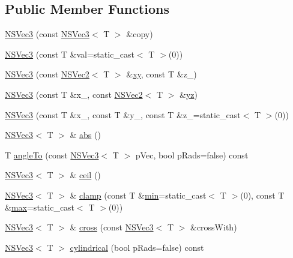 \subsection*{Public Member Functions}
\begin{DoxyCompactItemize}
\item 
\hyperlink{structNSVec3_afa2852c9c17d1de1ab37ed323a54cedb}{N\-S\-Vec3} (const \hyperlink{structNSVec3}{N\-S\-Vec3}$<$ T $>$ \&copy)
\item 
\hyperlink{structNSVec3_ad362b1e55972d16a1752adb532b90678}{N\-S\-Vec3} (const T \&val=static\-\_\-cast$<$ T $>$(0))
\item 
\hyperlink{structNSVec3_a1672ba90e50ea33772e1677b43bcda99}{N\-S\-Vec3} (const \hyperlink{structNSVec2}{N\-S\-Vec2}$<$ T $>$ \&\hyperlink{structNSVec3_ad8219932251db48672b0b2e751712da3}{xy}, const T \&z\-\_\-)
\item 
\hyperlink{structNSVec3_ae5cc1961e5246a9c51963e2192d71bf5}{N\-S\-Vec3} (const T \&x\-\_\-, const \hyperlink{structNSVec2}{N\-S\-Vec2}$<$ T $>$ \&\hyperlink{structNSVec3_ad9006cfc08381fb525d43715059f7c15}{yz})
\item 
\hyperlink{structNSVec3_a3a57d1b05f16261d62cbc2a3f1d5b0fa}{N\-S\-Vec3} (const T \&x\-\_\-, const T \&y\-\_\-, const T \&z\-\_\-=static\-\_\-cast$<$ T $>$(0))
\item 
\hyperlink{structNSVec3}{N\-S\-Vec3}$<$ T $>$ \& \hyperlink{structNSVec3_a38ab45cd8abd559d6928ad8ad340c62f}{abs} ()
\item 
T \hyperlink{structNSVec3_a823e2f3b0452a0cc95c9d509abb2aa43}{angle\-To} (const \hyperlink{structNSVec3}{N\-S\-Vec3}$<$ T $>$ p\-Vec, bool p\-Rads=false) const 
\item 
\hyperlink{structNSVec3}{N\-S\-Vec3}$<$ T $>$ \& \hyperlink{structNSVec3_aa318fd9abf141791c07175be64c9f4f1}{ceil} ()
\item 
\hyperlink{structNSVec3}{N\-S\-Vec3}$<$ T $>$ \& \hyperlink{structNSVec3_ab366e3e98af0c4a50837d60ed83bd7c3}{clamp} (const T \&\hyperlink{structNSVec3_a4abde3a564d1c15252ac74b1dd6efe6e}{min}=static\-\_\-cast$<$ T $>$(0), const T \&\hyperlink{structNSVec3_a63b923b7af3dd11e4b7f0d027f35d076}{max}=static\-\_\-cast$<$ T $>$(0))
\item 
\hyperlink{structNSVec3}{N\-S\-Vec3}$<$ T $>$ \& \hyperlink{structNSVec3_a7f61959a4ea0c32199b26c99d0f681ea}{cross} (const \hyperlink{structNSVec3}{N\-S\-Vec3}$<$ T $>$ \&cross\-With)
\item 
\hyperlink{structNSVec3}{N\-S\-Vec3}$<$ T $>$ \hyperlink{structNSVec3_a44c54ea99d144d02fa8015b3dfb8e6ab}{cylindrical} (bool p\-Rads=false) const 

\end{DoxyCompactItemize}
